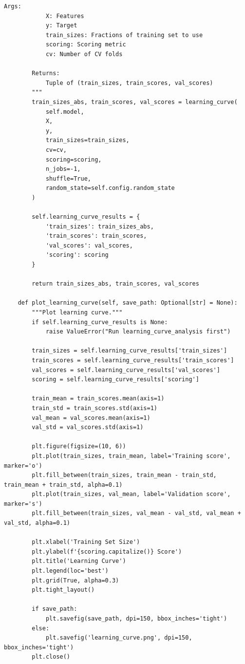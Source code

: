 \begin{lstlisting}[style=python, caption={Production Model Validation Framework}]
        Args:
            X: Features
            y: Target
            train_sizes: Fractions of training set to use
            scoring: Scoring metric
            cv: Number of CV folds

        Returns:
            Tuple of (train_sizes, train_scores, val_scores)
        """
        train_sizes_abs, train_scores, val_scores = learning_curve(
            self.model,
            X,
            y,
            train_sizes=train_sizes,
            cv=cv,
            scoring=scoring,
            n_jobs=-1,
            shuffle=True,
            random_state=self.config.random_state
        )

        self.learning_curve_results = {
            'train_sizes': train_sizes_abs,
            'train_scores': train_scores,
            'val_scores': val_scores,
            'scoring': scoring
        }

        return train_sizes_abs, train_scores, val_scores

    def plot_learning_curve(self, save_path: Optional[str] = None):
        """Plot learning curve."""
        if self.learning_curve_results is None:
            raise ValueError("Run learning_curve_analysis first")

        train_sizes = self.learning_curve_results['train_sizes']
        train_scores = self.learning_curve_results['train_scores']
        val_scores = self.learning_curve_results['val_scores']
        scoring = self.learning_curve_results['scoring']

        train_mean = train_scores.mean(axis=1)
        train_std = train_scores.std(axis=1)
        val_mean = val_scores.mean(axis=1)
        val_std = val_scores.std(axis=1)

        plt.figure(figsize=(10, 6))
        plt.plot(train_sizes, train_mean, label='Training score', marker='o')
        plt.fill_between(train_sizes, train_mean - train_std, train_mean + train_std, alpha=0.1)
        plt.plot(train_sizes, val_mean, label='Validation score', marker='s')
        plt.fill_between(train_sizes, val_mean - val_std, val_mean + val_std, alpha=0.1)

        plt.xlabel('Training Set Size')
        plt.ylabel(f'{scoring.capitalize()} Score')
        plt.title('Learning Curve')
        plt.legend(loc='best')
        plt.grid(True, alpha=0.3)
        plt.tight_layout()

        if save_path:
            plt.savefig(save_path, dpi=150, bbox_inches='tight')
        else:
            plt.savefig('learning_curve.png', dpi=150, bbox_inches='tight')
        plt.close()


\end{lstlisting}
